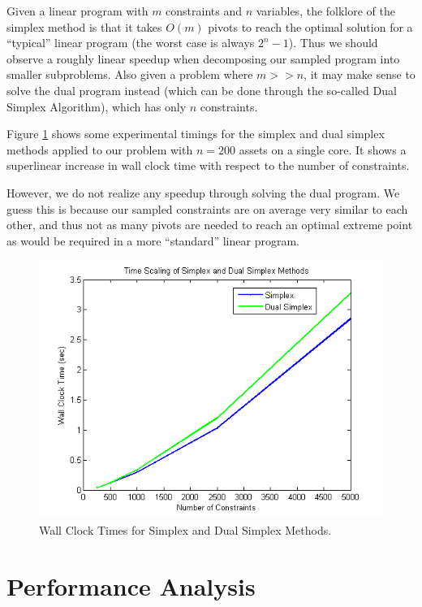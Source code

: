 \documentclass[12pt]{article}
\begin{document}
Given a linear program with $m$ constraints and $n$ variables, the folklore of the simplex method is that it takes $O(m)$ pivots to reach the optimal solution for a ``typical'' linear program (the worst case is always $2^n - 1$).
Thus we should observe a roughly linear speedup when decomposing our sampled program into smaller subproblems.
Also given a problem where $m >> n$, it may make sense to solve the dual program instead (which can be done through the so-called Dual Simplex Algorithm), which has only $n$ constraints.

Figure \ref{fig:fig_simplex_time} shows some experimental timings for the simplex and dual simplex methods applied to our problem with $n = 200$ assets on a single core.
It shows a superlinear increase in wall clock time with respect to the number of constraints.

However, we do not realize any speedup through solving the dual program.  
We guess this is because our sampled constraints are on average very similar to each other, and thus not as many pivots are needed to reach an optimal extreme point as would be required in a more ``standard'' linear program.

\begin{figure}[ht]
	\centering
		\includegraphics[scale=0.9]{../plot/figs/fig_simplex_time.png}
	\caption{Wall Clock Times for Simplex and Dual Simplex Methods.}
	\label{fig:fig_simplex_time}
\end{figure}

\section*{Performance Analysis}
\end{document}
